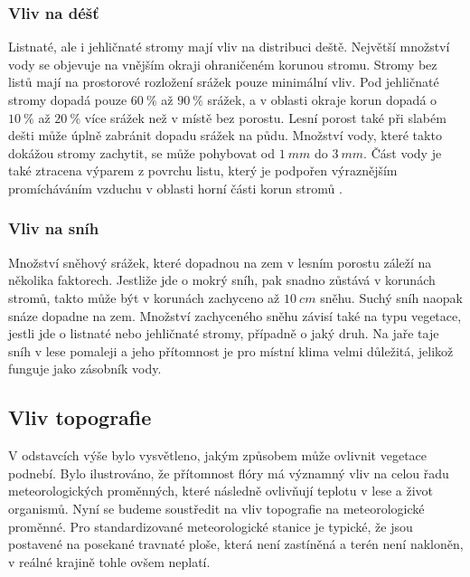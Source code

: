 \subsubsection{Vliv na déšť}
Listnaté, ale i jehličnaté stromy mají vliv na distribuci deště. Největší množství vody se objevuje na vnějším okraji ohraničeném korunou stromu. Stromy bez listů mají na prostorové rozložení srážek pouze minimální vliv. Pod jehličnaté stromy dopadá pouze $\SI{60}{\%}$ až $\SI{90}{\%}$ srážek, a v oblasti okraje korun dopadá o $\SI{10}{\%}$ až $\SI{20}{\%}$ více srážek než v místě bez porostu. Lesní porost také při slabém dešti může úplně zabránit dopadu srážek na půdu. Množství vody, které takto dokážou stromy zachytit, se může pohybovat od $\SI{1}{mm}$ do $\SI{3}{mm}$. Část vody je také ztracena výparem z povrchu listu, který je podpořen výraznějším promícháváním vzduchu v oblasti horní části korun stromů \cite{alma}.

\subsubsection{Vliv na sníh}
Množství sněhový srážek, které dopadnou na zem v lesním porostu záleží na několika faktorech. Jestliže jde o mokrý sníh, pak snadno zůstává v korunách stromů, takto může být v korunách zachyceno až $\SI{10}{cm}$ sněhu. Suchý sníh naopak snáze dopadne na zem. Množství zachyceného sněhu závisí také na typu vegetace, jestli jde o listnaté nebo jehličnaté stromy, případně o jaký druh. Na jaře taje sníh v lese pomaleji a jeho přítomnost je pro místní klima velmi důležitá, jelikož funguje jako zásobník vody\cite{alma}.

\subsection{Vliv topografie} \label{chap:topo}
V odstavcích výše bylo vysvětleno, jakým způsobem může ovlivnit vegetace podnebí. Bylo ilustrováno, že přítomnost flóry má významný vliv na celou řadu meteorologických proměnných, které následně ovlivňují teplotu v lese a život organismů. Nyní se budeme soustředit na vliv topografie na meteorologické proměnné. Pro standardizované meteorologické stanice je typické, že jsou postavené na posekané travnaté ploše, která není zastíněná a terén není nakloněn, v reálné krajině tohle ovšem neplatí.

